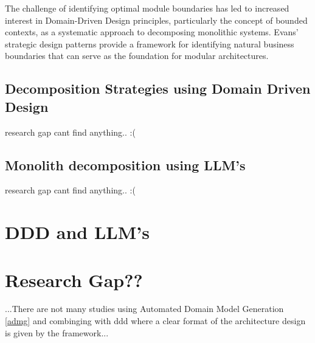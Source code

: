 The challenge of identifying optimal module boundaries has led to increased interest in Domain-Driven Design principles, particularly the concept of bounded contexts, as a systematic approach to decomposing monolithic systems. Evans' \autocite{evans2004domain} strategic design patterns provide a framework for identifying natural business boundaries that can serve as the foundation for modular architectures.

\subsection{Decomposition Strategies using Domain Driven Design}
research gap cant find anything.. :(

\subsection{Monolith decomposition using LLM's}
research gap cant find anything.. :(

\section{DDD and LLM's}


\section{Research Gap??}
...There are not many studies using Automated Domain Model Generation \ref{admg} and combinging with ddd where a clear format of the architecture design is given by the framework...